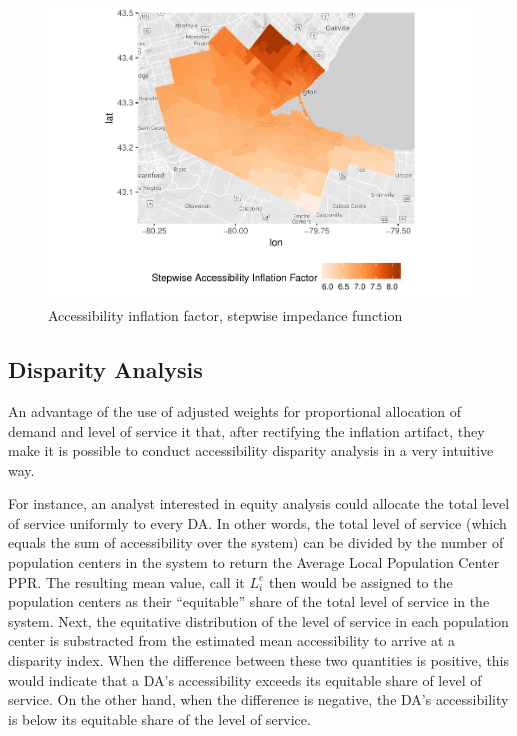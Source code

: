 \documentclass[10pt,letterpaper]{article}
\begin{document}
\begin{figure}
\includegraphics[width=0.95\linewidth]{Supply_and_Demand_Inflation_in_FCA_Methods_v2.0_files/figure-latex/fig18-map-accessibility-stepwise-comparison-1} \caption{\label{fig:fig18-map-accessibility-stepwise-comparison}Accessibility inflation factor, stepwise impedance function}\label{fig:fig18-map-accessibility-stepwise-comparison}
\end{figure}

\subsection{Disparity Analysis}\label{disparity-analysis}

An advantage of the use of adjusted weights for proportional allocation
of demand and level of service it that, after rectifying the inflation
artifact, they make it is possible to conduct accessibility disparity
analysis in a very intuitive way.

For instance, an analyst interested in equity analysis could allocate
the total level of service uniformly to every DA. In other words, the
total level of service (which equals the sum of accessibility over the
system) can be divided by the number of population centers in the system
to return the Average Local Population Center PPR. The resulting mean
value, call it \(L_i^e\) then would be assigned to the population
centers as their ``equitable'' share of the total level of service in
the system. Next, the equitative distribution of the level of service in
each population center is substracted from the estimated mean
accessibility to arrive at a disparity index. When the difference
between these two quantities is positive, this would indicate that a
DA's accessibility exceeds its equitable share of level of service. On
the other hand, when the difference is negative, the DA's accessibility
is below its equitable share of the level of service.
\end{document}
